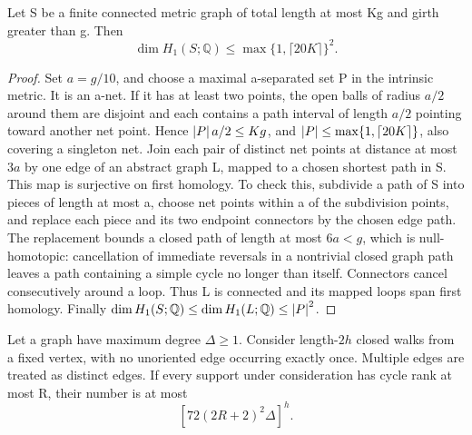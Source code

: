 \begin{lemma}
\label{lem:moment-support-rank}
Let S be a finite connected metric graph of total length at most Kg and girth
greater than g.  Then
\[
 \dim H_1(S;\mathbb Q)\leq \max\{1,\lceil20K\rceil\}^2.
\]
\end{lemma}

\begin{proof}
Set \(a=g/10\), and choose a maximal a-separated set P in the intrinsic
metric.  It is an a-net.  If it has at least two points, the open balls of
radius \(a/2\) around them are disjoint and each contains a path interval of
length \(a/2\) pointing toward another net point.  Hence
\(\left\lvert P\right\rvert a/2\leq Kg\), and
\(\left\lvert P\right\rvert\leq\max\{1,\lceil20K\rceil\}\), also covering a singleton net.
Join each pair of distinct net points at distance at most \(3a\) by one edge
of an abstract graph L, mapped to a chosen shortest path in S.  This map is
surjective on first homology.  To check this, subdivide a path of S into pieces
of length at most a, choose net points within a of the subdivision points,
and replace each piece and its two endpoint connectors by the chosen edge
path.  The replacement bounds a closed path of length at most \(6a<g\), which
is null-homotopic: cancellation of immediate reversals in a nontrivial closed
graph path leaves a path containing a simple cycle no longer than itself.
Connectors cancel consecutively around a loop.  Thus L is connected and its
mapped loops span first homology.  Finally
\(\dim H_1(S;\mathbb Q)\leq\dim H_1(L;\mathbb Q)\leq\left\lvert P\right\rvert^2\).
\end{proof}

\begin{lemma}
\label{lem:repeated-edge-count}
Let a graph have maximum degree \(\Delta\geq1\).  Consider length-\(2h\)
closed walks from a fixed vertex, with no unoriented edge occurring exactly
once.  Multiple edges are treated as distinct edges.
If every support under consideration has cycle rank at most R, their
number is at most
\[
 [72(2R+2)^2\Delta]^h.
\]
\end{lemma}

